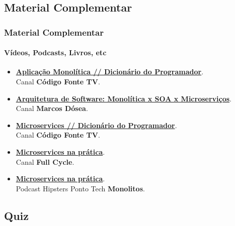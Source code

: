 \documentclass[
	10pt, %
	t, %
]{beamer}
\begin{document}


\subsection{Material Complementar}

\begin{frame}
	\frametitle{Material Complementar}
	\framesubtitle{Vídeos, Podcasts, Livros, etc}
	
	\begin{itemize}
		\item \href{https://youtu.be/CsrHHHPHKwE}{\textbf{Aplicação Monolítica // Dicionário do Programador}}.\\Canal \textbf{Código Fonte TV}.
		\item \href{https://youtu.be/suZfVAk7hco}{\textbf{Arquitetura de Software: Monolítica x SOA x Microserviços}}.\\Canal \textbf{Marcos Dósea}.
		\item \href{https://www.youtube.com/watch?v=_2bDOCTnbKc}{\textbf{Microservices // Dicionário do Programador}}.\\Canal \textbf{Código Fonte TV}.
		\item \href{https://youtu.be/gtv9szE_P1U}{\textbf{Microservices na prática}}.\\Canal \textbf{Full Cycle}.
		\item \href{https://www.hipsters.tech/uma-linguagem-para-cada-combate-hipsters-ponto-tech-277}{\textbf{Microservices na prática}}.\\Podcast Hipsters Ponto Tech \textbf{Monolitos}.
	\end{itemize}
	
\end{frame}

\subsection{Quiz}

\end{document}
